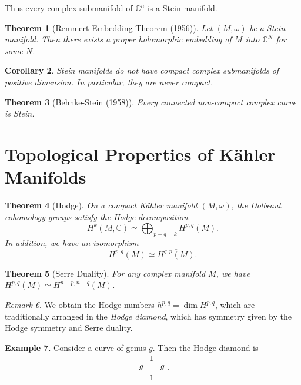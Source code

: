 \documentclass[leqno, openany]{memoir}
\newtheorem{thm}{Theorem}[chapter]
\newtheorem{cor}[thm]{Corollary}
\theoremstyle{definition}
\newtheorem{exm}[thm]{Example}
\theoremstyle{remark}
\newtheorem{rmk}[thm]{Remark}
\theoremstyle{plain}
\theoremstyle{definition}
\theoremstyle{remark}
\renewcommand{\C}{\mathbb{C}}
\begin{document}
Thus every complex submanifold of $\C^n$ is a Stein manifold.

\begin{thm}[Remmert Embedding Theorem (1956)]
    Let $(M, \omega)$ be a Stein manifold. Then there exists a proper holomorphic embedding of $M$ into $\C^N$ for some $N$.
\end{thm}

\begin{cor}
    Stein manifolds do not have compact complex submanifolds of positive dimension. In particular, they are never compact.
\end{cor}

\begin{thm}[Behnke-Stein (1958)]
    Every connected non-compact complex curve is Stein.
\end{thm}

\section{Topological Properties of K\"ahler Manifolds}%
\label{sec:topological_properties_of_k"ahler_manifolds}

\begin{thm}[Hodge]
    On a compact K\"ahler manifold $(M, \omega)$, the Dolbeaut cohomology groups satisfy the Hodge decomposition
    \[ H^k(M, \C) \simeq \bigoplus_{p+q=k} H^{p,q}(M). \]
    In addition, we have an isomorphism
    \[ H^{p,q}(M) \simeq \overline{H^{q,p}(M)}. \]
\end{thm}

\begin{thm}[Serre Duality]
    For any complex manifold $M$, we have $H^{p,q}(M) \simeq H^{n-p,n-q}(M)$.
\end{thm}

\begin{rmk}
    We obtain the Hodge numbers $h^{p,q} = \dim H^{p,q}$, which are traditionally arranged in the \textit{Hodge diamond}, which has symmetry given by the Hodge symmetry and Serre duality.
\end{rmk}

\begin{exm}
    Consider a curve of genus $g$. Then the Hodge diamond is
    \[ \begin{array}{ccc}
        & 1 & \\
        g & & g \\
          & 1 &
    \end{array}.\]
\end{exm}
\end{document}
